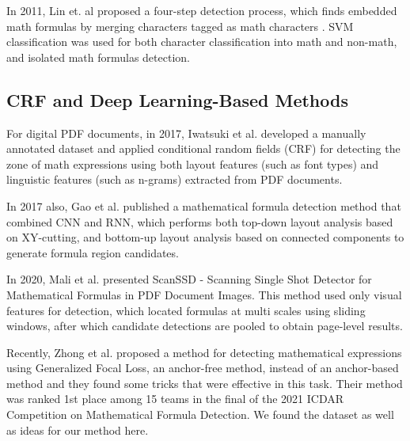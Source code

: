 In 2011, Lin et. al proposed a four-step detection process, which finds embedded math formulas by merging characters tagged as math characters \cite{Lin2011}. SVM classification was used for both character classification into math and non-math, and isolated math formulas detection.

\subsection{CRF and Deep Learning-Based Methods}
For digital PDF documents, in 2017, Iwatsuki et al. \cite{Iwatsuki2017} developed a manually annotated dataset and applied conditional random fields (CRF) for detecting the zone of math expressions using both layout features (such as font types) and linguistic features (such as n-grams) extracted from PDF documents.

In 2017 also, Gao et al. \cite{Gao2017} published a mathematical formula detection method that combined CNN and RNN, which performs both top-down layout analysis based on XY-cutting, and bottom-up layout analysis based on connected components to generate formula region candidates.

In 2020, Mali et al. \cite{Mali2020} presented ScanSSD - Scanning Single Shot Detector for Mathematical Formulas in PDF Document Images. This method used only visual features for detection, which located formulas at multi scales using sliding windows, after which candidate detections are pooled to obtain page-level results.

Recently, Zhong et al.\cite{1stprize} proposed a method for detecting mathematical expressions using Generalized Focal Loss, an anchor-free method, instead of an anchor-based method and they found some tricks that were effective in this task. Their method was ranked 1st place among 15 teams in the final of the 2021 ICDAR Competition on Mathematical Formula Detection. We found the dataset as well as ideas for our method here.

